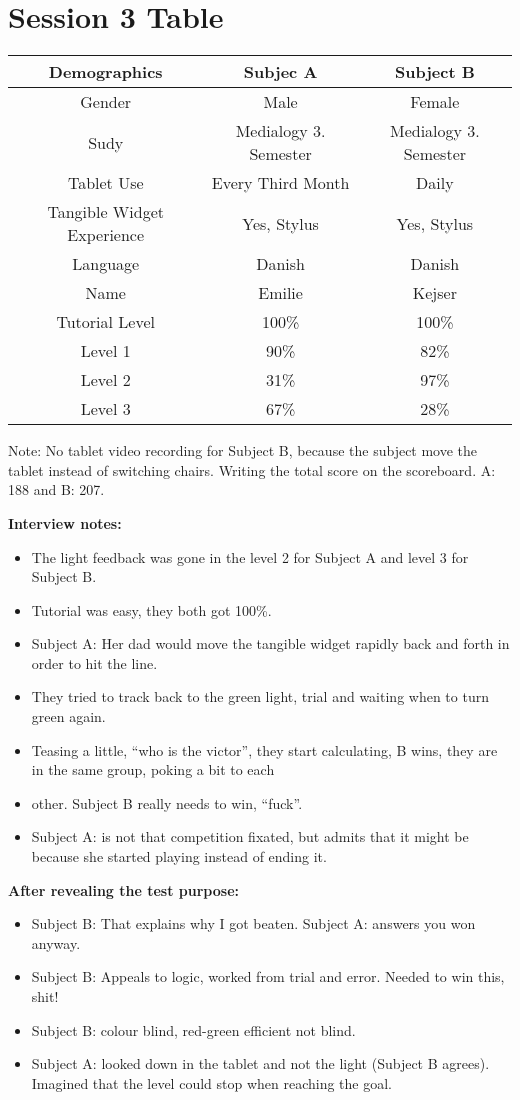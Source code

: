 \section*{Session 3 Table}
\begin{tabular}{|c|c|c|}
\hline 
\textbf{Demographics} & Subjec A & Subject B \\ 
\hline 
Gender & Male  & Female \\ 
\hline 
Sudy & Medialogy 3. Semester & Medialogy 3. Semester \\ 
\hline 
Tablet Use & Every Third Month & Daily \\ 
\hline 
Tangible Widget Experience & Yes, Stylus & Yes, Stylus  \\ 
\hline 
Language & Danish & Danish\\ 
\hline 
Name & Emilie & Kejser\\ 
\hline \hline
Tutorial Level & 100\% & 100\% \\ 
\hline 
Level 1 & 90\% & 82\% \\ 
\hline 
Level 2 & 31\% & 97\% \\ 
\hline 
Level 3 & 67\% & 28\% \\ 
\hline 
\end{tabular} 

Note: No tablet video recording for Subject B, because the subject move the tablet instead of switching chairs. Writing the total score on the scoreboard. A: 188 and B: 207.

\textbf{Interview notes:}
\begin{itemize}
\item The light feedback was gone in the level 2 for Subject A and level 3 for Subject B.
\item Tutorial was easy, they both got 100\%.
\item Subject A: Her dad would move the tangible widget rapidly back and forth in order to hit the line.
\item They tried to track back to the green light, trial and waiting when to turn green again.
\item Teasing a little, “who is the victor”, they start calculating, B wins, they are in the same group, poking a bit to each \item other. Subject B really needs to win, “fuck”.
\item Subject A: is not that competition fixated, but admits that it might be because she started playing instead of ending it. 
\end{itemize}

\textbf{After revealing the test purpose:}
\begin{itemize}
\item Subject B: That explains why I got beaten. Subject A: answers you won anyway.
\item Subject B: Appeals to logic, worked from trial and error. Needed to win this, shit!
\item Subject B: colour blind, red-green efficient not blind.
\item Subject A: looked down in the tablet and not the light (Subject B agrees). Imagined that the level could stop when reaching the goal.
\end{itemize}

